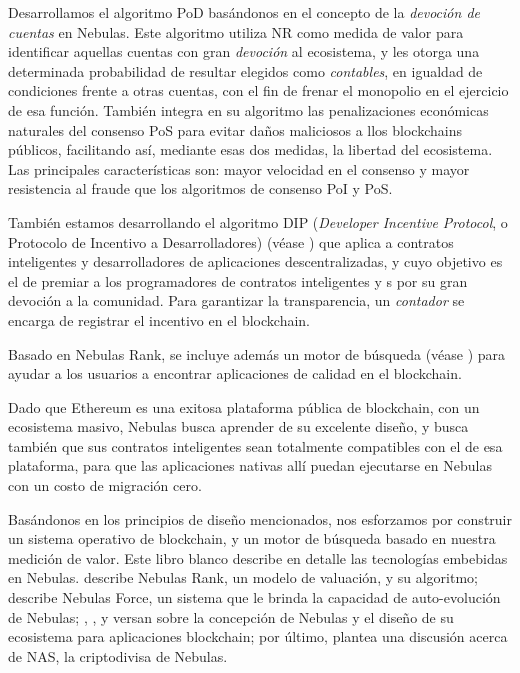 \begin{itemize}
Desarrollamos el algoritmo PoD  basándonos en el concepto de la \textit{devoción de cuentas} en Nebulas. Este algoritmo utiliza NR como medida de valor para identificar aquellas cuentas con gran \textit{devoción} al ecosistema, y les otorga una determinada probabilidad de resultar elegidos como \textit{contables}, en igualdad de condiciones frente a otras cuentas, con el fin de frenar el monopolio en el ejercicio de esa función. También integra en su algoritmo las penalizaciones económicas naturales del consenso PoS para evitar daños maliciosos a llos blockchains públicos, facilitando así, mediante esas dos medidas, la libertad del ecosistema. Las principales características son: mayor velocidad en el consenso y mayor resistencia al fraude que los algoritmos de consenso PoI y PoS.

También estamos desarrollando el algoritmo DIP (\textit{Developer Incentive Protocol}, o Protocolo de Incentivo a Desarrolladores) (véase ) que aplica a contratos inteligentes y desarrolladores de aplicaciones descentralizadas, y cuyo objetivo es el de premiar a los programadores de contratos inteligentes y {\dapp}s por su gran devoción a la comunidad. Para garantizar la transparencia, un \textit{contador} se encarga de registrar el incentivo en el blockchain.

Basado en Nebulas Rank, se incluye además un motor de búsqueda (véase ) para ayudar a los usuarios a encontrar aplicaciones de calidad en el blockchain.

\end{itemize}

Dado que Ethereum es una exitosa plataforma pública de blockchain, con un ecosistema masivo, Nebulas busca aprender de su excelente diseño, y busca también que sus contratos inteligentes sean totalmente compatibles con el de esa plataforma, para que las aplicaciones nativas allí puedan ejecutarse en Nebulas con un costo de migración cero.

Basándonos en los principios de diseño mencionados, nos esforzamos por construir un sistema operativo de blockchain, y un motor de búsqueda basado en nuestra medición de valor. Este libro blanco describe en detalle las tecnologías embebidas en Nebulas.  describe Nebulas Rank, un modelo de valuación, y su algoritmo;  describe Nebulas Force, un sistema que le brinda la capacidad de auto-evolución de Nebulas; , ,  y  versan sobre la concepción de Nebulas y el diseño de su ecosistema para aplicaciones blockchain; por último,  plantea una discusión acerca de NAS, la criptodivisa de Nebulas.